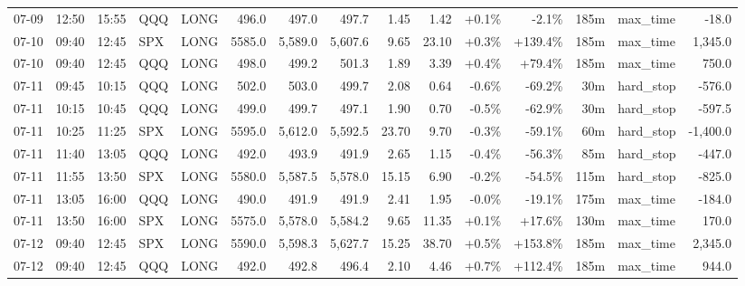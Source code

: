 \documentclass[11pt,a4paper,twoside]{article}
\begin{document}
\begin{landscape}
\begin{center}
\begin{longtable}{>{\color{txtmain}}l l l l l r r r r r r r r >{\color{txtmain}}l r}
07-09 & 12:50 & 15:55 & QQQ & LONG & 496.0 & 497.0 & 497.7 & 1.45 & 1.42 & \textcolor{wingreen}{+0.1\%} & \textcolor{lossred}{-2.1\%} & 185m & max\_time & \textcolor{lossred}{-18.0} \\
07-10 & 09:40 & 12:45 & SPX & LONG & 5585.0 & 5,589.0 & 5,607.6 & 9.65 & 23.10 & \textcolor{wingreen}{+0.3\%} & \textcolor{wingreen}{+139.4\%} & 185m & max\_time & \textcolor{wingreen}{1,345.0} \\
07-10 & 09:40 & 12:45 & QQQ & LONG & 498.0 & 499.2 & 501.3 & 1.89 & 3.39 & \textcolor{wingreen}{+0.4\%} & \textcolor{wingreen}{+79.4\%} & 185m & max\_time & \textcolor{wingreen}{750.0} \\
07-11 & 09:45 & 10:15 & QQQ & LONG & 502.0 & 503.0 & 499.7 & 2.08 & 0.64 & \textcolor{lossred}{-0.6\%} & \textcolor{lossred}{-69.2\%} & 30m & hard\_stop & \textcolor{lossred}{-576.0} \\
07-11 & 10:15 & 10:45 & QQQ & LONG & 499.0 & 499.7 & 497.1 & 1.90 & 0.70 & \textcolor{lossred}{-0.5\%} & \textcolor{lossred}{-62.9\%} & 30m & hard\_stop & \textcolor{lossred}{-597.5} \\
07-11 & 10:25 & 11:25 & SPX & LONG & 5595.0 & 5,612.0 & 5,592.5 & 23.70 & 9.70 & \textcolor{lossred}{-0.3\%} & \textcolor{lossred}{-59.1\%} & 60m & hard\_stop & \textcolor{lossred}{-1,400.0} \\
07-11 & 11:40 & 13:05 & QQQ & LONG & 492.0 & 493.9 & 491.9 & 2.65 & 1.15 & \textcolor{lossred}{-0.4\%} & \textcolor{lossred}{-56.3\%} & 85m & hard\_stop & \textcolor{lossred}{-447.0} \\
07-11 & 11:55 & 13:50 & SPX & LONG & 5580.0 & 5,587.5 & 5,578.0 & 15.15 & 6.90 & \textcolor{lossred}{-0.2\%} & \textcolor{lossred}{-54.5\%} & 115m & hard\_stop & \textcolor{lossred}{-825.0} \\
07-11 & 13:05 & 16:00 & QQQ & LONG & 490.0 & 491.9 & 491.9 & 2.41 & 1.95 & \textcolor{lossred}{-0.0\%} & \textcolor{lossred}{-19.1\%} & 175m & max\_time & \textcolor{lossred}{-184.0} \\
07-11 & 13:50 & 16:00 & SPX & LONG & 5575.0 & 5,578.0 & 5,584.2 & 9.65 & 11.35 & \textcolor{wingreen}{+0.1\%} & \textcolor{wingreen}{+17.6\%} & 130m & max\_time & \textcolor{wingreen}{170.0} \\
07-12 & 09:40 & 12:45 & SPX & LONG & 5590.0 & 5,598.3 & 5,627.7 & 15.25 & 38.70 & \textcolor{wingreen}{+0.5\%} & \textcolor{wingreen}{+153.8\%} & 185m & max\_time & \textcolor{wingreen}{2,345.0} \\
07-12 & 09:40 & 12:45 & QQQ & LONG & 492.0 & 492.8 & 496.4 & 2.10 & 4.46 & \textcolor{wingreen}{+0.7\%} & \textcolor{wingreen}{+112.4\%} & 185m & max\_time & \textcolor{wingreen}{944.0} \\

\end{longtable}
\end{center}
\end{landscape}
\end{document}
